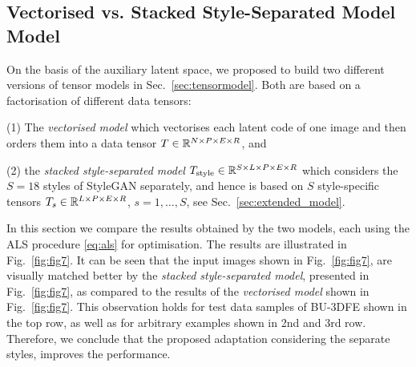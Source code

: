


\subsection{Vectorised vs. Stacked Style-Separated Model Model}
\label{sec:extmodel}

On the basis of the auxiliary latent space, we proposed to build two different versions of tensor models in Sec.~\ref{sec:tensormodel}. Both are based on a factorisation of different data tensors: 

(1) The \emph{vectorised model} which vectorises each latent code of one image and then orders them into a data tensor $T\in\mathbb{R}^{N\times P\times E\times R}$, and 

(2) the \emph{stacked style-separated model} $T_\text{style}\in\mathbb{R}^{S\times L\times P\times E\times R}$ which considers the $S=18$ styles of StyleGAN separately, and hence is based on $S$ style-specific tensors $T_s\in\mathbb{R}^{L\times P\times E\times R}$, $s=1,\ldots, S$, see Sec.~\ref{sec:extended_model}. 

In this section we compare the results obtained by the two models, each using the ALS procedure \eqref{eq:als} for optimisation. 
The results are illustrated in Fig.~\ref{fig:fig7}. It can be seen that the input images shown in Fig.~\ref{fig:fig7}, are visually matched better by the \emph{stacked style-separated model}, presented in Fig.~\ref{fig:fig7}, as compared to the results of the \emph{vectorised model} shown in Fig.~\ref{fig:fig7}. This observation holds for test data samples of BU-3DFE shown in the top row, as well as for arbitrary examples shown in 2nd and 3rd row. 
Therefore, we conclude that the proposed adaptation considering the separate styles, improves the performance. 

